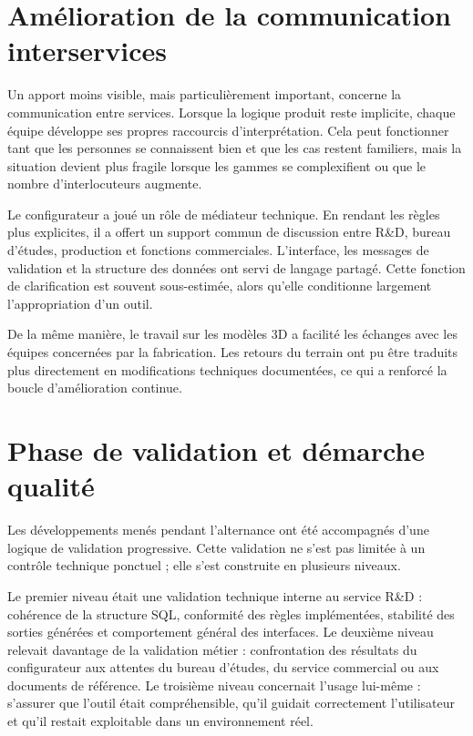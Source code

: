 \section{Amélioration de la communication interservices}

Un apport moins visible, mais particulièrement important, concerne la communication entre services. Lorsque la logique produit reste implicite, chaque équipe développe ses propres raccourcis d'interprétation. Cela peut fonctionner tant que les personnes se connaissent bien et que les cas restent familiers, mais la situation devient plus fragile lorsque les gammes se complexifient ou que le nombre d'interlocuteurs augmente.

Le configurateur a joué un rôle de médiateur technique. En rendant les règles plus explicites, il a offert un support commun de discussion entre R\&D, bureau d'études, production et fonctions commerciales. L'interface, les messages de validation et la structure des données ont servi de langage partagé. Cette fonction de clarification est souvent sous-estimée, alors qu'elle conditionne largement l'appropriation d'un outil.

De la même manière, le travail sur les modèles 3D a facilité les échanges avec les équipes concernées par la fabrication. Les retours du terrain ont pu être traduits plus directement en modifications techniques documentées, ce qui a renforcé la boucle d'amélioration continue.

\section{Phase de validation et démarche qualité}

Les développements menés pendant l'alternance ont été accompagnés d'une logique de validation progressive. Cette validation ne s'est pas limitée à un contrôle technique ponctuel ; elle s'est construite en plusieurs niveaux.

Le premier niveau était une validation technique interne au service R\&D : cohérence de la structure SQL, conformité des règles implémentées, stabilité des sorties générées et comportement général des interfaces. Le deuxième niveau relevait davantage de la validation métier : confrontation des résultats du configurateur aux attentes du bureau d'études, du service commercial ou aux documents de référence. Le troisième niveau concernait l'usage lui-même : s'assurer que l'outil était compréhensible, qu'il guidait correctement l'utilisateur et qu'il restait exploitable dans un environnement réel.

